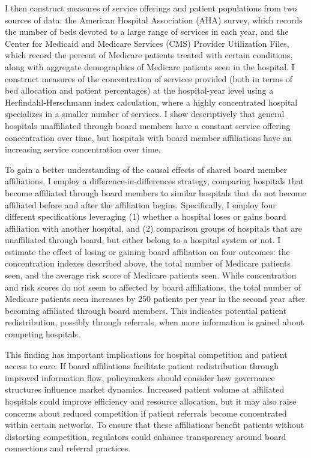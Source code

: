 \documentclass[12pt]{article}
\begin{document}
    I then construct measures of service offerings and patient populations from two sources of data: the American Hospital Association (AHA) survey, which records the number of beds devoted to a large range of services in each year, and the Center for Medicaid and Medicare Services (CMS) Provider Utilization Files, which record the percent of Medicare patients treated with certain conditions, along with aggregate demographics of Medicare patients seen in the hospital. I construct measures of the concentration of services provided (both in terms of bed allocation and patient percentages) at the hospital-year level using a Herfindahl-Herschmann index calculation, where a highly concentrated hospital specializes in a smaller number of services. I show descriptively that general hospitals unaffiliated through board members have a constant service offering concentration over time, but hospitals with board member affiliations have an increasing service concentration over time. 
    
    To gain a better understanding of the causal effects of shared board member affiliations, I employ a difference-in-differences strategy, comparing hospitals that become affiliated through board members to similar hospitals that do not become affiliated before and after the affiliation begins. Specifically, I employ four different specifications leveraging (1) whether a hospital loses or gains board affiliation with another hospital, and (2) comparison groups of hospitals that are unaffiliated through board, but either belong to a hospital system or not. I estimate the effect of losing or gaining board affiliation on four outcomes: the concentration indexes described above, the total number of Medicare patients seen, and the average risk score of Medicare patients seen. While concentration and risk scores do not seem to affected by board affiliations, the total number of Medicare patients seen increases by 250 patients per year in the second year after becoming affiliated through board members. This indicates potential patient redistribution, possibly through referrals, when more information is gained about competing hospitals. 

    This finding has important implications for hospital competition and patient access to care. If board affiliations facilitate patient redistribution through improved information flow, policymakers should consider how governance structures influence market dynamics. Increased patient volume at affiliated hospitals could improve efficiency and resource allocation, but it may also raise concerns about reduced competition if patient referrals become concentrated within certain networks. To ensure that these affiliations benefit patients without distorting competition, regulators could enhance transparency around board connections and referral practices. 
\end{document}
